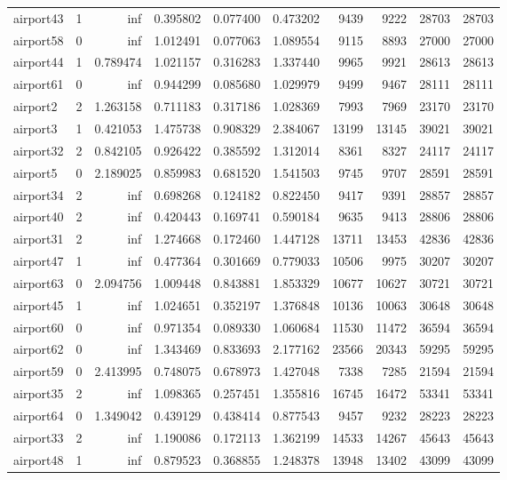 \begin{longtable}{|l|r|r|r|r|r|r|r|r|r|}
airport43 & 1 & inf & 0.395802 & 0.077400 & 0.473202 & 9439 & 9222 & 28703 & 28703 \\
airport58 & 0 & inf & 1.012491 & 0.077063 & 1.089554 & 9115 & 8893 & 27000 & 27000 \\
airport44 & 1 & 0.789474 & 1.021157 & 0.316283 & 1.337440 & 9965 & 9921 & 28613 & 28613 \\
airport61 & 0 & inf & 0.944299 & 0.085680 & 1.029979 & 9499 & 9467 & 28111 & 28111 \\
airport2 & 2 & 1.263158 & 0.711183 & 0.317186 & 1.028369 & 7993 & 7969 & 23170 & 23170 \\
airport3 & 1 & 0.421053 & 1.475738 & 0.908329 & 2.384067 & 13199 & 13145 & 39021 & 39021 \\
airport32 & 2 & 0.842105 & 0.926422 & 0.385592 & 1.312014 & 8361 & 8327 & 24117 & 24117 \\
airport5 & 0 & 2.189025 & 0.859983 & 0.681520 & 1.541503 & 9745 & 9707 & 28591 & 28591 \\
airport34 & 2 & inf & 0.698268 & 0.124182 & 0.822450 & 9417 & 9391 & 28857 & 28857 \\
airport40 & 2 & inf & 0.420443 & 0.169741 & 0.590184 & 9635 & 9413 & 28806 & 28806 \\
airport31 & 2 & inf & 1.274668 & 0.172460 & 1.447128 & 13711 & 13453 & 42836 & 42836 \\
airport47 & 1 & inf & 0.477364 & 0.301669 & 0.779033 & 10506 & 9975 & 30207 & 30207 \\
airport63 & 0 & 2.094756 & 1.009448 & 0.843881 & 1.853329 & 10677 & 10627 & 30721 & 30721 \\
airport45 & 1 & inf & 1.024651 & 0.352197 & 1.376848 & 10136 & 10063 & 30648 & 30648 \\
airport60 & 0 & inf & 0.971354 & 0.089330 & 1.060684 & 11530 & 11472 & 36594 & 36594 \\
airport62 & 0 & inf & 1.343469 & 0.833693 & 2.177162 & 23566 & 20343 & 59295 & 59295 \\
airport59 & 0 & 2.413995 & 0.748075 & 0.678973 & 1.427048 & 7338 & 7285 & 21594 & 21594 \\
airport35 & 2 & inf & 1.098365 & 0.257451 & 1.355816 & 16745 & 16472 & 53341 & 53341 \\
airport64 & 0 & 1.349042 & 0.439129 & 0.438414 & 0.877543 & 9457 & 9232 & 28223 & 28223 \\
airport33 & 2 & inf & 1.190086 & 0.172113 & 1.362199 & 14533 & 14267 & 45643 & 45643 \\
airport48 & 1 & inf & 0.879523 & 0.368855 & 1.248378 & 13948 & 13402 & 43099 & 43099 \\

\end{longtable}
